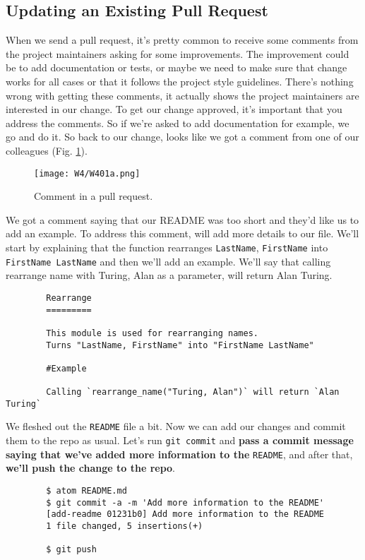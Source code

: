 	\subsection{Updating an Existing Pull Request}
	
	
	When we send a pull request, it's pretty common to receive some comments from the project maintainers asking for some improvements. The improvement could be to add documentation or tests, or maybe we need to make sure that change works for all cases or that it follows the project style guidelines. There's nothing wrong with getting these comments, it actually shows the project maintainers are interested in our change. To get our change approved, it's important that you address the comments. So if we're asked to add documentation for example, we go and do it. So back to our change, looks like we got a comment from one of our colleagues (Fig. \ref{W401a}).
	
	\begin{figure} 
		\caption{Comment in a pull request.}
		\centering
		\texttt{[image: W4/W401a.png]}
		\label{W401a}
	\end{figure}
	
	
	We got a comment saying that our README was too short and they'd like us to add an example. To address this comment, will add more details to our file. We'll start by explaining that the function rearranges \texttt{LastName}, \texttt{FirstName} into \texttt{FirstName LastName} and then we'll add an example. We'll say that calling rearrange name with Turing, Alan as a parameter, will return Alan Turing.
	
	\begin{verbatim}
		Rearrange
		=========
		
		This module is used for rearranging names.
		Turns "LastName, FirstName" into "FirstName LastName"
		
		#Example
		
		Calling `rearrange_name("Turing, Alan")` will return `Alan Turing`	
	\end{verbatim}
	
	We fleshed out the \texttt{README} file a bit. Now we can add our changes and commit them to the repo as usual. Let's run \texttt{git commit} and \textbf{pass a commit message saying that we've added more information to the} \texttt{README}, and after that, \textbf{we'll push the change to the repo}.
	
	\begin{verbatim}
		$ atom README.md
		$ git commit -a -m 'Add more information to the README'
		[add-readme 01231b0] Add more information to the README
		1 file changed, 5 insertions(+)
		
		$ git push
	\end{verbatim}
	

